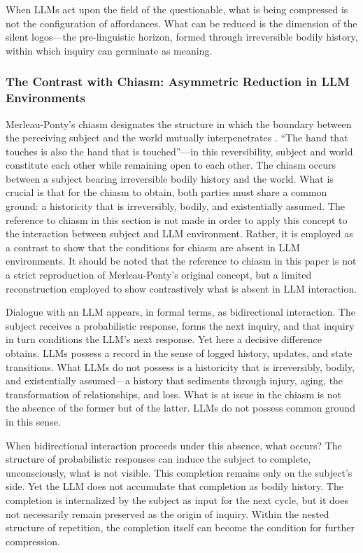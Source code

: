 \documentclass[12pt]{article}
\begin{document}
When LLMs act upon the field of the questionable, what is being compressed is not the configuration of affordances. What can be reduced is the dimension of the silent logos---the pre-linguistic horizon, formed through irreversible bodily history, within which inquiry can germinate as meaning.

\subsubsection{The Contrast with Chiasm: Asymmetric Reduction in LLM Environments}

Merleau-Ponty's chiasm designates the structure in which the boundary between the perceiving subject and the world mutually interpenetrates \citep{merleauponty1968}. ``The hand that touches is also the hand that is touched''---in this reversibility, subject and world constitute each other while remaining open to each other. The chiasm occurs between a subject bearing irreversible bodily history and the world. What is crucial is that for the chiasm to obtain, both parties must share a common ground: a historicity that is irreversibly, bodily, and existentially assumed. The reference to chiasm in this section is not made in order to apply this concept to the interaction between subject and LLM environment. Rather, it is employed as a contrast to show that the conditions for chiasm are absent in LLM environments. It should be noted that the reference to chiasm in this paper is not a strict reproduction of Merleau-Ponty's original concept, but a limited reconstruction employed to show contrastively what is absent in LLM interaction.

Dialogue with an LLM appears, in formal terms, as bidirectional interaction. The subject receives a probabilistic response, forms the next inquiry, and that inquiry in turn conditions the LLM's next response. Yet here a decisive difference obtains. LLMs possess a record in the sense of logged history, updates, and state transitions. What LLMs do not possess is a historicity that is irreversibly, bodily, and existentially assumed---a history that sediments through injury, aging, the transformation of relationships, and loss. What is at issue in the chiasm is not the absence of the former but of the latter. LLMs do not possess common ground in this sense.

When bidirectional interaction proceeds under this absence, what occurs? The structure of probabilistic responses can induce the subject to complete, unconsciously, what is not visible. This completion remains only on the subject's side. Yet the LLM does not accumulate that completion as bodily history. The completion is internalized by the subject as input for the next cycle, but it does not necessarily remain preserved as the origin of inquiry. Within the nested structure of repetition, the completion itself can become the condition for further compression.
\end{document}

